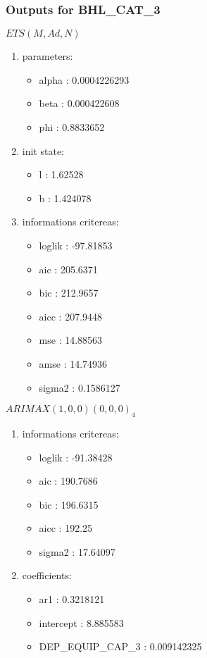 \documentclass[10pt,a4paper]{article}\usepackage[]{graphicx}\usepackage[]{color}
\newcommand{\AaA}{\_}
\begin{document}
\subsubsection{Outputs for BHL\AaA CAT\AaA 3}
\begin{multicols}{2}


$ ETS(M,Ad,N) $
\begin{enumerate}
\item parameters:
\begin{itemize}
\item  alpha :  0.0004226293 
\item  beta :  0.000422608 
\item  phi :  0.8833652 
\end{itemize}
\item init state:
\begin{itemize}
\item  l :  1.62528 
\item  b :  1.424078 
\end{itemize}
\item informations critereas:
\begin{itemize}
\item  loglik :  -97.81853 
\item  aic :  205.6371 
\item  bic :  212.9657 
\item  aicc :  207.9448 
\item  mse :  14.88563 
\item  amse :  14.74936 
\item  sigma2 :  0.1586127 
\end{itemize}
\end{enumerate}

\columnbreak


 $ARIMAX(1,0,0)(0,0,0)_{4}$ 
\begin{enumerate}
\item informations critereas:
\begin{itemize}
\item  loglik :  -91.38428 
\item  aic :  190.7686 
\item  bic :  196.6315 
\item  aicc :  192.25 
\item  sigma2 :  17.64097 
\end{itemize}

\item coefficients:
\begin{itemize}
\item  ar1 :  0.3218121 
\item  intercept :  8.885583 
\item  DEP\AaA EQUIP\AaA CAP\AaA 3 :  0.009142325 
\end{itemize}
\end{enumerate}
\end{multicols}
\end{document}
